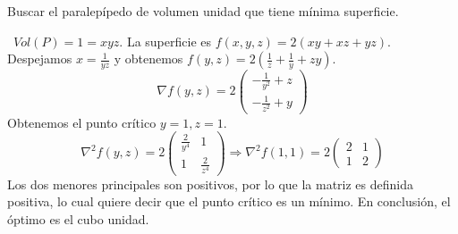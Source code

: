 \documentclass[twoside]{article}
\begin{document}
\begin{ejercicio}{7}
Buscar el paralepípedo de volumen unidad que tiene mínima superficie. 

\begin{solucion}\
$Vol(P)=1=xyz$. La superficie es $f(x,y,z)=2(xy+xz+yz)$. Despejamos $x=\frac{1}{yz}$ y obtenemos $f(y,z)=2(\frac{1}{z}+\frac{1}{y}+zy)$. 
$$\nabla f(y,z)=2\begin{pmatrix}
-\frac{1}{y^2}+z\\
-\frac{1}{z^2}+y
\end{pmatrix}$$
Obtenemos el punto crítico $y=1,z=1$.
$$\nabla^2f(y,z)=2\begin{pmatrix}
\frac{2}{y^4} & 1\\
1 & \frac{2}{z^4}
\end{pmatrix}\Rightarrow \nabla^2f(1,1)=2\begin{pmatrix}
2 & 1\\
1 & 2
\end{pmatrix}$$
Los dos menores principales son positivos, por lo que la matriz es definida positiva, lo cual quiere decir que el  punto crítico es un mínimo. En conclusión, el óptimo es el cubo unidad.
\end{solucion}
\end{ejercicio}

\newpage 
\end{document}
